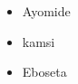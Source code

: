 \documentclass{article}
\begin{document}
	\begin{itemize}
		\item Ayomide
		\item kamsi
		\item Eboseta
	\end{itemize}
\end{document}

